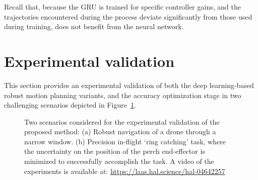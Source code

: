 Recall that, because the GRU is trained for specific controller gains, and the trajectories encountered during the  process deviate significantly from those used during training,  does not benefit from the neural network.

\section{Experimental validation} \label{sec:Experimental}

This section provides an experimental validation of both the deep learning-based robust motion planning variants, and the accuracy optimization stage in two challenging scenarios depicted in Figure~\ref{fig: Missed and succes}.

\begin{figure} [htp]
    \centering
    \caption{
    Two scenarios considered for the experimental validation of the proposed method:
    (a) Robust navigation of a drone through a narrow window. (b) Precision in-flight `ring catching' task, where the uncertainty on the position of the perch end-effector is minimized to successfully accomplish the task.
    A video of the experiments is available at: \href{https://laas.hal.science/hal-04642257}{https://laas.hal.science/hal-04642257}}%
    \label{fig: Missed and succes}%
\end{figure}

